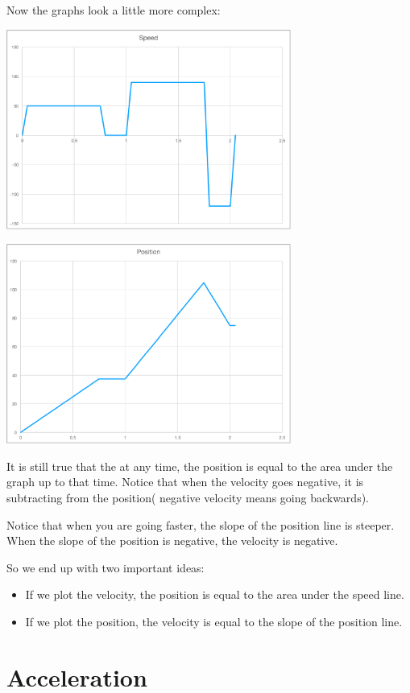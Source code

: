 Now the graphs look a little more complex:

\includegraphics[width=0.7\textwidth]{speed_stops.pdf}

\includegraphics[width=0.7\textwidth]{position_stops.pdf}

It is still true that the at any time, the position is equal to the
area under the graph up to that time. Notice that when the velocity goes
negative, it is subtracting from the position( negative velocity means going backwards).

Notice that when you are going faster, the slope of the position line
is steeper. When the slope of the position is negative, the velocity is
negative.

So we end up with two important ideas:
\begin{itemize}
\item If we plot the velocity, the position is equal to the area under the speed line.
\item If we plot the position, the velocity is equal to the slope of the position line.
\end{itemize}

\section{Acceleration}

